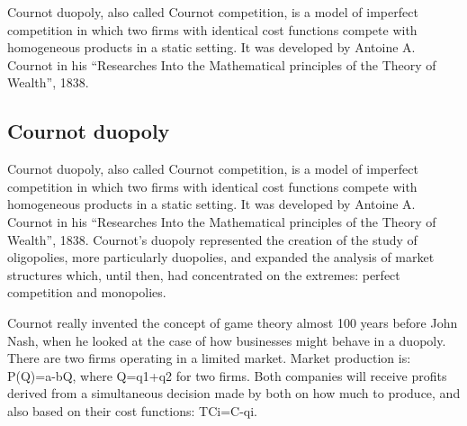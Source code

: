 \documentclass[]{report}
\begin{document}
Cournot duopoly, also called Cournot competition, is a model of imperfect competition in which two firms with identical cost functions compete with homogeneous products in a static setting. It was developed by Antoine A. Cournot in his “Researches Into the Mathematical principles of the Theory of Wealth”, 1838.

\subsection{Cournot duopoly}
Cournot duopoly, also called Cournot competition, is a model of imperfect competition in which two firms with identical cost functions compete with homogeneous products in a static setting. It was developed by Antoine A. Cournot in his “Researches Into the Mathematical principles of the Theory of Wealth”, 1838. Cournot’s duopoly represented the creation of the study of oligopolies, more particularly duopolies, and expanded the analysis of market structures which, until then, had concentrated on the extremes: perfect competition and monopolies.

Cournot really invented the concept of game theory almost 100 years before John Nash, when he looked at the case of how businesses might behave in a duopoly. There are two firms operating in a limited market. Market production is: P(Q)=a-bQ, where Q=q1+q2 for two firms. Both companies will receive profits derived from a simultaneous decision made by both on how much to produce, and also based on their cost functions: TCi=C-qi.
\end{document}
